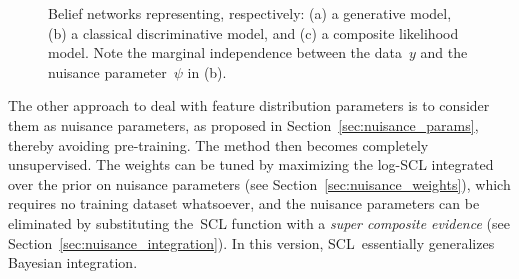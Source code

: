 \documentclass[english]{scrartcl}
\begin{document}
\begin{figure}[!ht]
\begin{center}
\hspace*{.05\textwidth}
\hspace*{.05\textwidth}
\caption{Belief networks representing, respectively: (a) a generative model, (b) a classical discriminative model, and (c) a composite likelihood model. Note the marginal independence between the data~$y$ and the nuisance parameter~$\psi$ in (b).}
\label{fig:dgraph}
\end{center}
\end{figure}


The other approach to deal with feature distribution parameters is to consider them as nuisance parameters, as proposed in Section~\ref{sec:nuisance_params}, thereby avoiding pre-training. The method then becomes completely unsupervised. The weights can be tuned by maximizing the log-SCL integrated over the prior on nuisance parameters (see Section~\ref{sec:nuisance_weights}), which requires no training dataset whatsoever, and the nuisance parameters can be eliminated by substituting the~SCL function with a {\em super composite evidence} (see Section~\ref{sec:nuisance_integration}). In this version, SCL~essentially generalizes Bayesian integration. 
\end{document}
